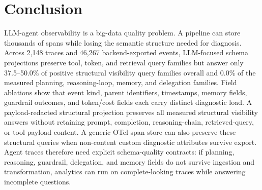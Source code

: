 \documentclass[conference]{IEEEtran}
\begin{document}
\section{Conclusion}
\label{sec:conclusion}

LLM-agent observability is a big-data quality problem. A pipeline can
store thousands of spans while losing the semantic structure needed for
diagnosis. Across 2,148 traces and 46,267 backend-exported events,
LLM-focused schema projections preserve tool, token, and retrieval query
families but answer only 37.5--50.0\% of positive structural visibility
query families overall and 0.0\% of the measured planning,
reasoning-loop, memory, and delegation families. Field ablations show
that event kind, parent identifiers, timestamps, memory fields,
guardrail outcomes, and token/cost fields each carry distinct diagnostic
load. A payload-redacted structural projection preserves all measured
structural visibility answers without retaining prompt, completion,
reasoning-chain, retrieved-query, or tool payload content. A generic
OTel span store can also preserve these structural queries when
non-content custom diagnostic attributes survive export. Agent traces
therefore need explicit schema-quality contracts: if planning,
reasoning, guardrail, delegation, and memory fields do not survive
ingestion and transformation, analytics can run on complete-looking
traces while answering incomplete questions.
\end{document}
